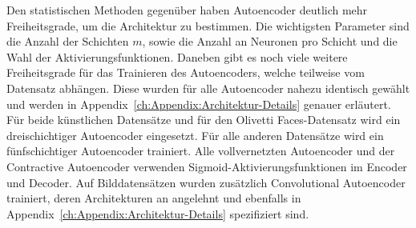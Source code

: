Den statistischen Methoden gegenüber haben Autoencoder deutlich mehr Freiheitsgrade, um die
Architektur zu bestimmen. Die wichtigsten Parameter sind die Anzahl der Schichten $m$, sowie die
Anzahl an Neuronen pro Schicht und die Wahl der Aktivierungsfunktionen. Daneben gibt es noch viele
weitere Freiheitsgrade für das Trainieren des Autoencoders, welche teilweise vom Datensatz
abhängen. Diese wurden für alle Autoencoder nahezu identisch gewählt und werden in
Appendix~\ref{ch:Appendix:Architektur-Details} genauer erläutert. Für beide künstlichen Datensätze
und für den Olivetti Faces-Datensatz wird ein dreischichtiger
Autoencoder eingesetzt. Für alle anderen Datensätze wird ein fünfschichtiger Autoencoder trainiert.
Alle vollvernetzten Autoencoder und der Contractive Autoencoder verwenden
Sigmoid-Aktivierungsfunktionen im Encoder und Decoder. Auf Bilddatensätzen wurden zusätzlich
Convolutional Autoencoder trainiert, deren Architekturen an \textcite[14]{Ghosh.2019} angelehnt und
ebenfalls in Appendix~\ref{ch:Appendix:Architektur-Details} spezifiziert sind.

